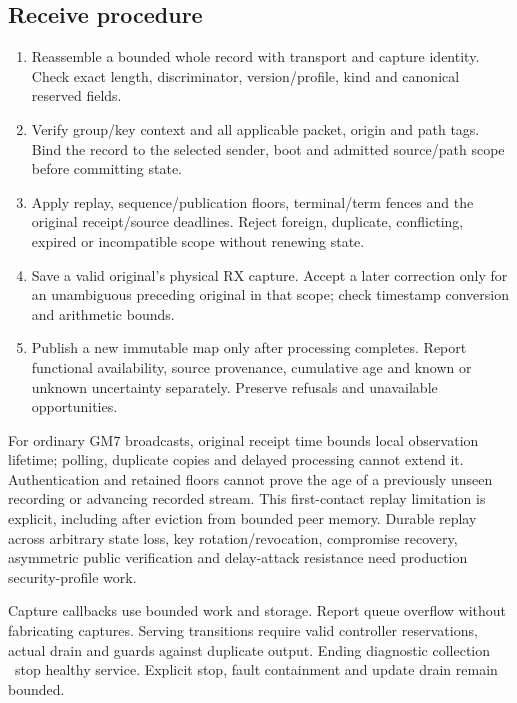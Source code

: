 \documentclass[11pt,letterpaper]{article}
\begin{document}
\subsection*{Receive procedure}
\begin{enumerate}
\item Reassemble a bounded whole record with transport and capture identity. Check exact length, discriminator, version/profile, kind and canonical reserved fields.
\item Verify group/key context and all applicable packet, origin and path tags. Bind the record to the selected sender, boot and admitted source/path scope before committing state.
\item Apply replay, sequence/publication floors, terminal/term fences and the original receipt/source deadlines. Reject foreign, duplicate, conflicting, expired or incompatible scope without renewing state.
\item Save a valid original's physical RX capture. Accept a later correction only for an unambiguous preceding original in that scope; check timestamp conversion and arithmetic bounds.
\item Publish a new immutable map only after processing completes. Report functional availability, source provenance, cumulative age and known or unknown uncertainty separately. Preserve refusals and unavailable opportunities.
\end{enumerate}
For ordinary GM7 broadcasts, original receipt time bounds local observation lifetime; polling, duplicate copies and delayed processing cannot extend it. Authentication and retained floors cannot prove the age of a previously unseen recording or advancing recorded stream. This first-contact replay limitation is explicit, including after eviction from bounded peer memory. Durable replay across arbitrary state loss, key rotation/revocation, compromise recovery, asymmetric public verification and delay-attack resistance need production security-profile work.

Capture callbacks use bounded work and storage. Report queue overflow without fabricating captures. Serving transitions require valid controller reservations, actual drain and guards against duplicate output. Ending diagnostic collection \mustnot\ stop healthy service. Explicit stop, fault containment and update drain remain bounded.

\page
\end{document}
